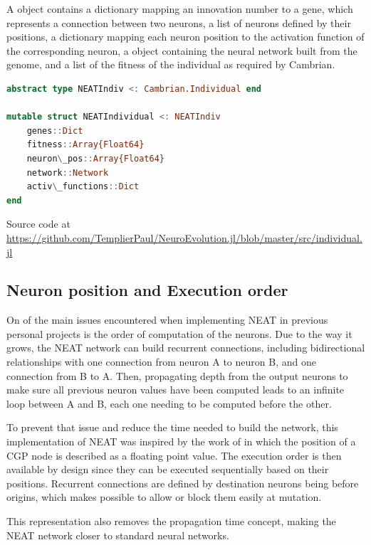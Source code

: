 A  object contains a dictionary mapping an innovation number to a gene, which represents a connection between two neurons, a list of neurons defined by their positions, a dictionary mapping each neuron position to the activation function of the corresponding neuron, a  object containing the neural network built from the genome, and a list of the fitness of the individual as required by Cambrian.

\begin{minipage}{\linewidth}
\begin{lstlisting}[language=Julia, caption=NEAT Individual]
abstract type NEATIndiv <: Cambrian.Individual end

mutable struct NEATIndividual <: NEATIndiv
    genes::Dict
    fitness::Array{Float64}
    neuron\_pos::Array{Float64}
    network::Network
    activ\_functions::Dict
end
\end{lstlisting}
Source code at \url{https://github.com/TemplierPaul/NeuroEvolution.jl/blob/master/src/individual.jl}\\
\end{minipage}

\subsection{Neuron position and Execution order}
\label{subsec:NEAT_neur_pos}

On of the main issues encountered when implementing NEAT in previous personal projects is the order of computation of the neurons. Due to the way it grows, the NEAT network can build recurrent connections, including bidirectional relationships with one connection from neuron A to neuron B, and one connection from B to A. Then, propagating depth from the output neurons to make sure all previous neuron values have been computed leads to an infinite loop between A and B, each one needing to be computed before the other. 

To prevent that issue and reduce the time needed to build the network, this implementation of NEAT was inspired by the work of \cite{wilson2018positionalcgp} in which the position of a CGP node is described as a floating point value. The execution order is then available by design since they can be executed sequentially based on their positions. Recurrent connections are defined by destination neurons being before origins, which makes possible to allow or block them easily at mutation. 

This representation also removes the propagation time concept, making the NEAT network closer to standard neural networks. 

